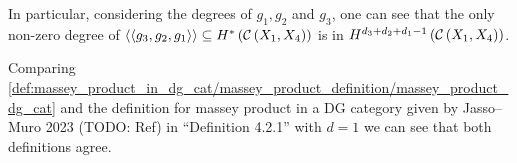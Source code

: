 \begin{remark}
    \label{rem:massey_product_in_dg_cat/massey_product_definition/massey_product_sum_of_degrees}
    In particular, considering the degrees of \( g_1, g_2 \) and \( g_3 \), one can see that the only non-zero degree of \( \langle\langle g_3, g_2, g_1  \rangle\rangle \subseteq H^* \left( {\mathcal{C}} \left( X_1, X_4 \right) \right) \) is in \( H^{d_3 + d_2 + d_1 - 1} \left( {\mathcal{C}} \left( X_1, X_4 \right) \right) \).
\end{remark}

\begin{remark}
    Comparing \autoref{def:massey_product_in_dg_cat/massey_product_definition/massey_product_dg_cat} and the definition for massey product in a DG category given by Jasso--Muro 2023 (TODO: Ref) in ``Definition 4.2.1'' with \( d = 1 \) we can see that both definitions agree.
\end{remark}

